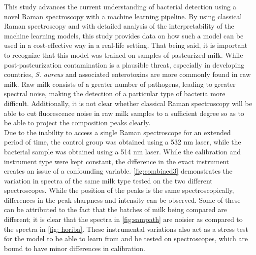 This study advances the current understanding of bacterial detection using a novel Raman spectroscopy with a machine learning pipeline. By using classical Raman spectroscopy and with detailed analysis of the interpretability of the machine learning models, this study provides data on how such a model can be used in a cost-effective way in a real-life setting. That being said, it is important to recognize that this model was trained on samples of pasteurized milk. While post-pasteurization contamination is a plausible threat, especially in developing countries, \textit{S. aureus} and associated enterotoxins are more commonly found in raw milk. Raw milk consists of a greater number of pathogens, leading to greater spectral noise, making the detection of a particular type of bacteria more difficult. \cite{Quigley2013_JDS4928} Additionally, it is not clear whether classical Raman spectroscopy will be able to cut fluorescence noise in raw milk samples to a sufficient degree so as to be able to project the composition peaks clearly. \\

\noindent Due to the inability to access a single Raman spectroscope for an extended period of time, the control group was obtained using a 532 nm laser, while the bacterial sample was obtained using a 514 nm laser. While the calibration and instrument type were kept constant, the difference in the exact instrument creates an issue of a confounding variable. \autoref{fig:combined3} demonstrates the variation in spectra of the same milk type tested on the two different spectroscopes. While the position of the peaks is the same spectroscopically, differences in the peak sharpness and intensity can be observed. Some of these can be attributed to the fact that the batches of milk being compared are different; it is clear that the spectra in \autoref{fig:sampath} are noisier as compared to the spectra in \autoref{fig: horiba}. These instrumental variations also act as a stress test for the model to be able to learn from and be tested on spectroscopes, which are bound to have minor differences in calibration. \\

